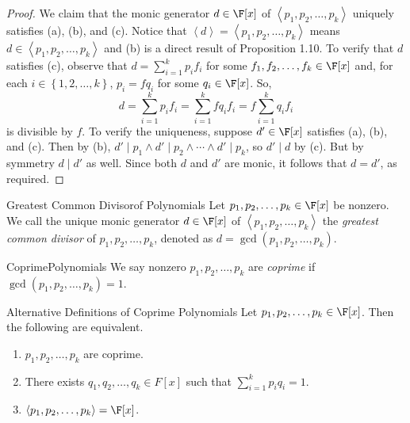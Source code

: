 \documentclass[linearalgebraII]{subfiles}
\begin{document}
    \begin{proof}
        We claim that the monic generator $d\in \F[x]$ of $\left< p_1, p_2, \ldots, p_k \right>$ uniquely satisfies (a), (b), and (c). Notice that $\left< d \right> = \left< p_1, p_2, \ldots, p_k \right>$ means $d\in \left< p_1, p_2, \ldots, p_k \right>$ and (b) is a direct result of Proposition 1.10. To verify that $d$ satisfies (c), observe that $d = \sum^{k}_{i=1} p_if_i$ for some $f_1, f_2, \ldots, f_k\in \F[x]$ and, for each $i\in \left\lbrace 1, 2, \ldots, k \right\rbrace
        $, $p_i = fq_i$ for some $q_i\in \F[x]$. So,
        \begin{equation*}
            d = \sum^{k}_{i=1} p_if_i = \sum^{k}_{i=1}  fq_if_i = f \sum^{k}_{i=1} q_if_i
        \end{equation*}
        is divisible by $f$. To verify the uniqueness, suppose $d'\in\F[x]$ satisfies (a), (b), and (c). Then by (b), $d'\mid p_1\land d'\mid p_2\land\cdots\land d'\mid p_k$, so $d'\mid d$ by (c). But by symmetry $d\mid d'$ as well. Since both $d$ and $d'$ are monic, it follows that $d=d'$, as required.
    \end{proof}

    \begin{definition}{Greatest Common Divisor}{of Polynomials}
        Let $p_1, p_2, \ldots, p_k\in \F[x]$ be nonzero. We call the unique monic generator $d\in \F[x]$ of $\left< p_1, p_2, \ldots, p_k \right>$ the \emph{greatest common divisor} of $p_1, p_2, \ldots, p_k$, denoted as $d = \gcd \left( p_1, p_2, \ldots, p_k \right)$. 
    \end{definition}

    \begin{definition}{Coprime}{Polynomials}
        We say nonzero $p_1, p_2, \ldots, p_k$ are \emph{coprime} if $\gcd(p_1, p_2, \ldots, p_k) = 1$.
    \end{definition}

    \begin{prop}{Alternative Definitions of Coprime Polynomials}
        Let $p_1, p_2, \ldots, p_k\in \F[x]$. Then the following are equivalent.
        \begin{enumerate}
            \item $p_1, p_2, \ldots, p_k$ are coprime.
            \item There exists $q_1, q_2, \ldots, q_k\in F[x]$ such that $\sum^k_{i=1} p_iq_i = 1$.
            \item $\left< p_1, p_2, \ldots, p_k \right> = \F[x]$. 
        \end{enumerate}
    \end{prop}
\end{document}
